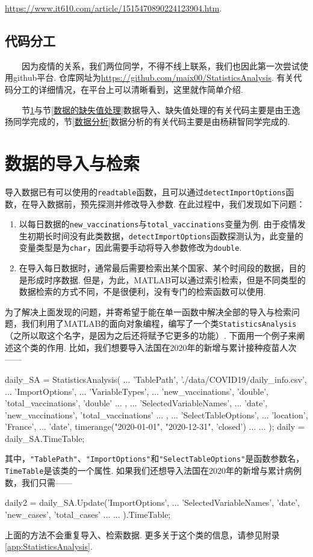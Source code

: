 \documentclass[a4paper, titlepage]{article}
\begin{document}
        \url{https://www.it610.com/article/1515470890224123904.htm}.

        \subsection{代码分工}
        　　因为疫情的关系，我们两位同学，不得不线上联系，我们也因此第一次尝试使用github平台. 仓库网址为\url{https://github.com/maix00/StatisticsAnalysis}. 有关代码分工的详细情况，在平台上可以清晰看到，这里就作简单介绍.

        　　节\ref{数据的导入}与节\ref{数据的缺失值处理}数据导入、缺失值处理的有关代码主要是由王逸扬同学完成的，节\ref{数据分析}数据分析的有关代码主要是由杨耕智同学完成的.

    \section{数据的导入与检索}\label{数据的导入}
        导入数据已有可以使用的\texttt{readtable}函数，且可以通过\texttt{detectImportOptions}函数，在导入数据前，预先探测并修改导入参数. 在此过程中，我们发现如下问题：
        \begin{enumerate}
            \item [(1)] 以每日数据的\texttt{new\_vaccinations}与\texttt{total\_vaccinations}变量为例. 由于疫情发生初期长时间没有此类数据，\texttt{detectImportOptions}函数探测认为，此变量的变量类型是为\texttt{char}，因此需要手动将导入参数修改为\texttt{double}.
            \item [(2)] 在导入每日数据时，通常最后需要检索出某个国家、某个时间段的数据，目的是形成时序数据. 但是，为此，MATLAB可以通过索引检索，但是不同类型的数据检索的方式不同，不是很便利，没有专门的检索函数可以使用.
        \end{enumerate}
        为了解决上面发现的问题，并寄希望于能在单一函数中解决全部的导入与检索问题，我们利用了MATLAB的面向对象编程，编写了一个类\texttt{StatisticsAnalysis}（之所以取这个名字，是因为之后还将赋予它更多的功能）. 下面用一个例子来阐述这个类的作用. 比如，我们想要导入法国在2020年的新增与累计接种疫苗人次——
\begin{matlabcode}
daily_SA = StatisticsAnalysis( ...
    'TablePath', './data/COVID19/daily_info.csv', ...
    'ImportOptions', { ...
        'VariableTypes', { ...
            'new_vaccinations', 'double',
            'total_vaccinations', 'double' ...
            }, ...
        'SelectedVariableNames', ...
            {'date', 'new_vaccinations', 'total_vaccinations'} ...
        }, ...
    'SelectTableOptions', { ...
        'location', 'France', ...
        'date', timerange("2020-01-01", "2020-12-31", 'closed') ...
        } ...
    );
daily = daily_SA.TimeTable;
\end{matlabcode}
        其中，\texttt{"TablePath"}、\texttt{"ImportOptions"}和\texttt{"SelectTableOptions"}是函数参数名，\texttt{TimeTable}是该类的一个属性. 如果我们还想导入法国在2020年的新增与累计病例数，我们只需——
\begin{matlabcode}
daily2 = daily_SA.Update('ImportOptions', { ...
        'SelectedVariableNames', {'date', 'new_cases', 'total_cases'} ...
        }...
    ).TimeTable;
\end{matlabcode}
        上面的方法不会重复导入、检索数据. 更多关于这个类的信息，请参见附录\ref{app:StatisticsAnalysis}. 
\end{document}
